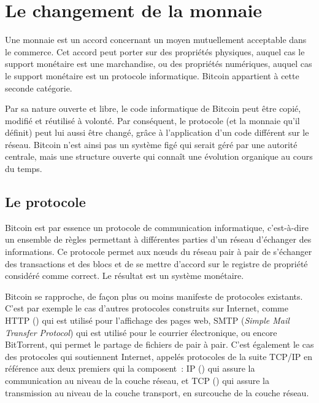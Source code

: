 
\chapter{Le changement de la monnaie}
\label{ch:changement}

Une monnaie est un accord concernant un moyen mutuellement acceptable dans le commerce. Cet accord peut porter sur des propriétés physiques, auquel cas le support monétaire est une marchandise, ou des propriétés numériques, auquel cas le support monétaire est un protocole informatique. Bitcoin appartient à cette seconde catégorie.

Par sa nature ouverte et libre, le code informatique de Bitcoin peut être copié, modifié et réutilisé à volonté. Par conséquent, le protocole (et la monnaie qu'il définit) peut lui aussi être changé, grâce à l'application d'un code différent sur le réseau. Bitcoin n'est ainsi pas un système figé qui serait géré par une autorité centrale, mais une structure ouverte qui connaît une évolution organique au cours du temps.

\section*{Le protocole}

Bitcoin est par essence un protocole de communication informatique, c'est-à-dire un ensemble de règles permettant à différentes parties d'un réseau d'échanger des informations. Ce protocole permet aux nœuds du réseau pair à pair de s'échanger des transactions et des blocs et de se mettre d'accord sur le registre de propriété considéré comme correct. Le résultat est un système monétaire.

Bitcoin se rapproche, de façon plus ou moins manifeste de protocoles existants. C'est par exemple le cas d'autres protocoles construits sur Internet, comme HTTP () qui est utilisé pour l'affichage des pages web, SMTP (\emph{Simple Mail Transfer Protocol}) qui est utilisé pour le courrier électronique, ou encore BitTorrent, qui permet le partage de fichiers de pair à pair. C'est également le cas des protocoles qui soutiennent Internet, appelés protocoles de la suite TCP/IP en référence aux deux premiers qui la composent~: IP () qui assure la communication au niveau de la couche réseau, et TCP () qui assure la transmission au niveau de la couche transport, en surcouche de la couche réseau.

